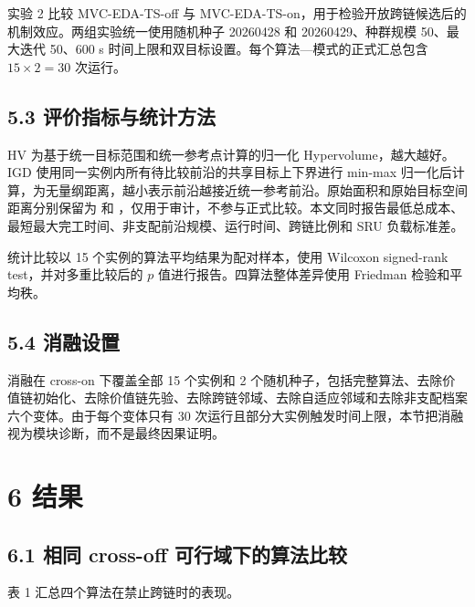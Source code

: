 \documentclass[UTF8,11pt]{ctexart}
\begin{document}
实验 2 比较 MVC-EDA-TS-off 与 MVC-EDA-TS-on，用于检验开放跨链候选后的机制效应。两组实验统一使用随机种子 20260428 和 20260429、种群规模 50、最大迭代 50、600 s 时间上限和双目标设置。每个算法—模式的正式汇总包含 \(15\times2=30\) 次运行。

\subsection*{5.3 评价指标与统计方法}

HV 为基于统一目标范围和统一参考点计算的归一化 Hypervolume，越大越好。IGD 使用同一实例内所有待比较前沿的共享目标上下界进行 min-max 归一化后计算，为无量纲距离，越小表示前沿越接近统一参考前沿。原始面积和原始目标空间距离分别保留为 \texttt{} 和 \texttt{}，仅用于审计，不参与正式比较。本文同时报告最低总成本、最短最大完工时间、非支配前沿规模、运行时间、跨链比例和 SRU 负载标准差。

统计比较以 15 个实例的算法平均结果为配对样本，使用 Wilcoxon signed-rank test，并对多重比较后的 \(p\) 值进行报告。四算法整体差异使用 Friedman 检验和平均秩。

\subsection*{5.4 消融设置}

消融在 cross-on 下覆盖全部 15 个实例和 2 个随机种子，包括完整算法、去除价值链初始化、去除价值链先验、去除跨链邻域、去除自适应邻域和去除非支配档案六个变体。由于每个变体只有 30 次运行且部分大实例触发时间上限，本节把消融视为模块诊断，而不是最终因果证明。

\section*{6 结果}

\subsection*{6.1 相同 cross-off 可行域下的算法比较}

表 1 汇总四个算法在禁止跨链时的表现。
\end{document}
